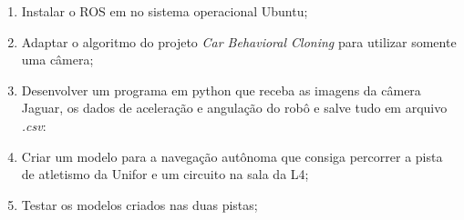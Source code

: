 \begin{enumerate}
\item Instalar o ROS em no sistema operacional Ubuntu;
\item Adaptar o algoritmo do projeto \textit{Car Behavioral Cloning} para utilizar somente uma câmera;
\item Desenvolver um programa em python que receba as imagens da câmera Jaguar, os dados de aceleração e angulação do robô e salve tudo em arquivo \textit{.csv}:
\item Criar um modelo para a navegação autônoma que consiga percorrer a pista de atletismo da Unifor e um circuito na sala da L4;
\item Testar os modelos criados nas duas pistas;
\end{enumerate}
